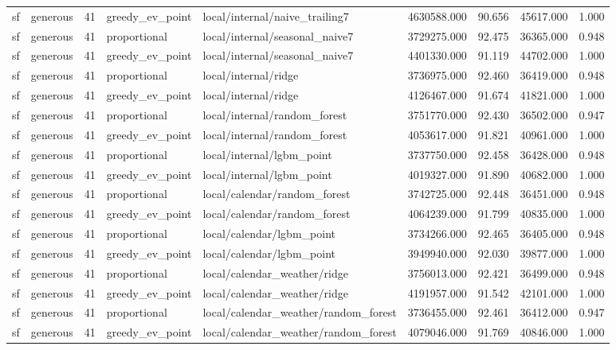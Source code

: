 \begin{tabular}{llrllrrrr}
sf & generous & 41 & greedy\_ev\_point & local/internal/naive\_trailing7 & 4630588.000 & 90.656 & 45617.000 & 1.000 \\
sf & generous & 41 & proportional & local/internal/seasonal\_naive7 & 3729275.000 & 92.475 & 36365.000 & 0.948 \\
sf & generous & 41 & greedy\_ev\_point & local/internal/seasonal\_naive7 & 4401330.000 & 91.119 & 44702.000 & 1.000 \\
sf & generous & 41 & proportional & local/internal/ridge & 3736975.000 & 92.460 & 36419.000 & 0.948 \\
sf & generous & 41 & greedy\_ev\_point & local/internal/ridge & 4126467.000 & 91.674 & 41821.000 & 1.000 \\
sf & generous & 41 & proportional & local/internal/random\_forest & 3751770.000 & 92.430 & 36502.000 & 0.947 \\
sf & generous & 41 & greedy\_ev\_point & local/internal/random\_forest & 4053617.000 & 91.821 & 40961.000 & 1.000 \\
sf & generous & 41 & proportional & local/internal/lgbm\_point & 3737750.000 & 92.458 & 36428.000 & 0.948 \\
sf & generous & 41 & greedy\_ev\_point & local/internal/lgbm\_point & 4019327.000 & 91.890 & 40682.000 & 1.000 \\
sf & generous & 41 & proportional & local/calendar/random\_forest & 3742725.000 & 92.448 & 36451.000 & 0.948 \\
sf & generous & 41 & greedy\_ev\_point & local/calendar/random\_forest & 4064239.000 & 91.799 & 40835.000 & 1.000 \\
sf & generous & 41 & proportional & local/calendar/lgbm\_point & 3734266.000 & 92.465 & 36405.000 & 0.948 \\
sf & generous & 41 & greedy\_ev\_point & local/calendar/lgbm\_point & 3949940.000 & 92.030 & 39877.000 & 1.000 \\
sf & generous & 41 & proportional & local/calendar\_weather/ridge & 3756013.000 & 92.421 & 36499.000 & 0.948 \\
sf & generous & 41 & greedy\_ev\_point & local/calendar\_weather/ridge & 4191957.000 & 91.542 & 42101.000 & 1.000 \\
sf & generous & 41 & proportional & local/calendar\_weather/random\_forest & 3736455.000 & 92.461 & 36412.000 & 0.947 \\
sf & generous & 41 & greedy\_ev\_point & local/calendar\_weather/random\_forest & 4079046.000 & 91.769 & 40846.000 & 1.000 \\

\end{tabular}
